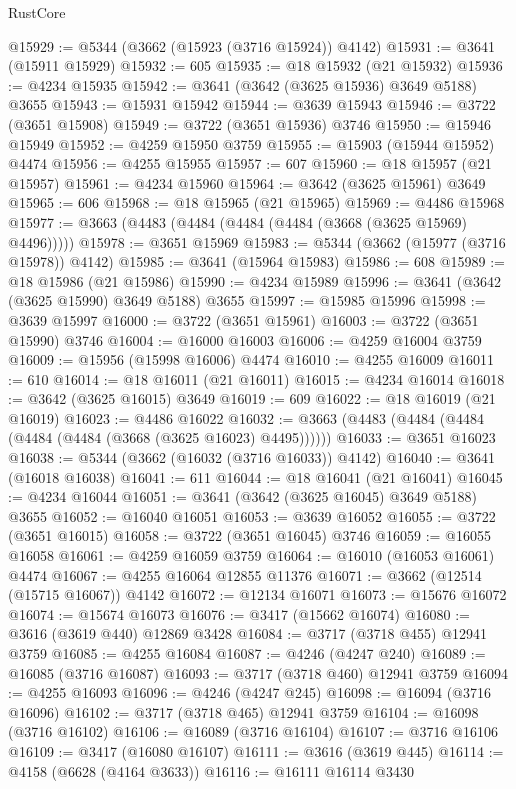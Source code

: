 \begin{lexlean}{RustCore}
\begin{coremodule}
@15929 := @5344 (@3662 (@15923 (@3716 @15924)) @4142)
@15931 := @3641 (@15911 @15929)
@15932 := 605
@15935 := @18 @15932 (@21 @15932)
@15936 := @4234 @15935
@15942 := @3641 (@3642 (@3625 @15936) @3649 @5188) @3655
@15943 := @15931 @15942
@15944 := @3639 @15943
@15946 := @3722 (@3651 @15908)
@15949 := @3722 (@3651 @15936) @3746
@15950 := @15946 @15949
@15952 := @4259 @15950 @3759
@15955 := @15903 (@15944 @15952) @4474
@15956 := @4255 @15955
@15957 := 607
@15960 := @18 @15957 (@21 @15957)
@15961 := @4234 @15960
@15964 := @3642 (@3625 @15961) @3649
@15965 := 606
@15968 := @18 @15965 (@21 @15965)
@15969 := @4486 @15968
@15977 := @3663 (@4483 (@4484 (@4484 (@4484 (@3668 (@3625 @15969) @4496)))))
@15978 := @3651 @15969
@15983 := @5344 (@3662 (@15977 (@3716 @15978)) @4142)
@15985 := @3641 (@15964 @15983)
@15986 := 608
@15989 := @18 @15986 (@21 @15986)
@15990 := @4234 @15989
@15996 := @3641 (@3642 (@3625 @15990) @3649 @5188) @3655
@15997 := @15985 @15996
@15998 := @3639 @15997
@16000 := @3722 (@3651 @15961)
@16003 := @3722 (@3651 @15990) @3746
@16004 := @16000 @16003
@16006 := @4259 @16004 @3759
@16009 := @15956 (@15998 @16006) @4474
@16010 := @4255 @16009
@16011 := 610
@16014 := @18 @16011 (@21 @16011)
@16015 := @4234 @16014
@16018 := @3642 (@3625 @16015) @3649
@16019 := 609
@16022 := @18 @16019 (@21 @16019)
@16023 := @4486 @16022
@16032 := @3663 (@4483 (@4484 (@4484 (@4484 (@4484 (@3668 (@3625 @16023) @4495))))))
@16033 := @3651 @16023
@16038 := @5344 (@3662 (@16032 (@3716 @16033)) @4142)
@16040 := @3641 (@16018 @16038)
@16041 := 611
@16044 := @18 @16041 (@21 @16041)
@16045 := @4234 @16044
@16051 := @3641 (@3642 (@3625 @16045) @3649 @5188) @3655
@16052 := @16040 @16051
@16053 := @3639 @16052
@16055 := @3722 (@3651 @16015)
@16058 := @3722 (@3651 @16045) @3746
@16059 := @16055 @16058
@16061 := @4259 @16059 @3759
@16064 := @16010 (@16053 @16061) @4474
@16067 := @4255 @16064 @12855 @11376
@16071 := @3662 (@12514 (@15715 @16067)) @4142
@16072 := @12134 @16071
@16073 := @15676 @16072
@16074 := @15674 @16073
@16076 := @3417 (@15662 @16074)
@16080 := @3616 (@3619 @440) @12869 @3428
@16084 := @3717 (@3718 @455) @12941 @3759
@16085 := @4255 @16084
@16087 := @4246 (@4247 @240)
@16089 := @16085 (@3716 @16087)
@16093 := @3717 (@3718 @460) @12941 @3759
@16094 := @4255 @16093
@16096 := @4246 (@4247 @245)
@16098 := @16094 (@3716 @16096)
@16102 := @3717 (@3718 @465) @12941 @3759
@16104 := @16098 (@3716 @16102)
@16106 := @16089 (@3716 @16104)
@16107 := @3716 @16106
@16109 := @3417 (@16080 @16107)
@16111 := @3616 (@3619 @445)
@16114 := @4158 (@6628 (@4164 @3633))
@16116 := @16111 @16114 @3430

\end{coremodule}
\end{lexlean}
